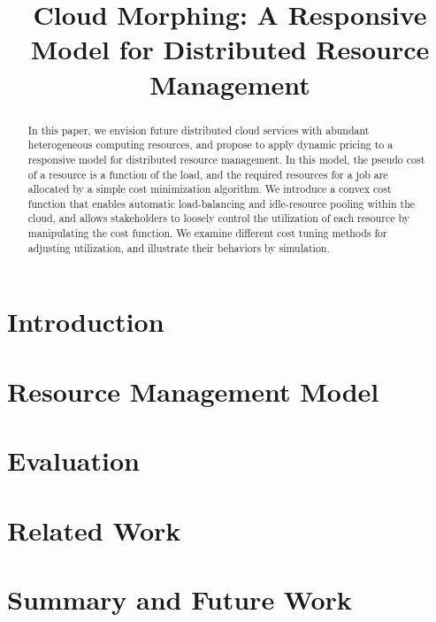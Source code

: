 \documentclass[10pt,sigconf,letterpaper,anonymous,nonacm]{acmart}
\title{Cloud Morphing: A Responsive Model for Distributed Resource Management}
\begin{document}
\begin{abstract}

    In this paper, we envision future distributed cloud services with
    abundant heterogeneous computing resources,
    and propose to apply dynamic pricing to a responsive model for
    distributed resource management.
    In this model, the pseudo cost of a resource is a function of the
    load, and the required resources for a job are allocated by a simple
    cost minimization algorithm.
    We introduce a convex cost function that enables automatic
    load-balancing and idle-resource pooling within the cloud, and allows
    stakeholders to loosely control the utilization of each resource by
    manipulating the cost function. We examine different cost tuning
    methods for adjusting utilization, and illustrate their behaviors by
    simulation.

\end{abstract}

\maketitle

\section{Introduction}



\section{Resource Management Model}



\section{Evaluation}



\section{Related Work}



\section{Summary and Future Work}





\end{document}
